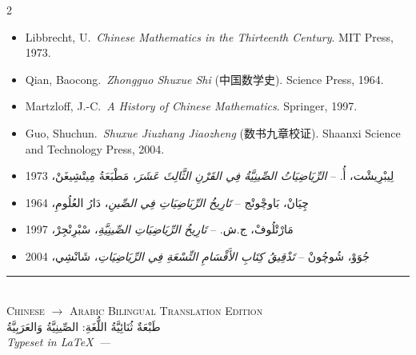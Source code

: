 \documentclass[11pt,a4paper]{article}
\newcommand{\ar}[1]{\arabicfont\beginR #1\endR}
\newcommand{\zhtext}[1]{{\chinese #1}}
\newenvironment{bilingual}{%
  \begin{paracol}{2}
}{%
  \end{paracol}
}
\begin{document}
\begin{bilingual}

\begin{leftcolumn*}
\begin{itemize}
  \item Libbrecht, U.\ \textit{Chinese Mathematics in the Thirteenth Century}. MIT Press, 1973.
  \item Qian, Baocong.\ \textit{Zhongguo Shuxue Shi} (\zhtext{中国数学史}). Science Press, 1964.
  \item Martzloff, J.-C.\ \textit{A History of Chinese Mathematics}. Springer, 1997.
  \item Guo, Shuchun.\ \textit{Shuxue Jiuzhang Jiaozheng} (\zhtext{数书九章校证}). Shaanxi Science and Technology Press, 2004.
\end{itemize}
\end{leftcolumn*}

\begin{rightcolumn*}
\begin{itemize}
  \item \ar{لِيبْرِيشْت، أُ. -- \textit{الرِّيَاضِيَاتُ الصِّينِيَّةُ فِي القَرْنِ الثَّالِثَ عَشَرَ}، مَطْبَعَةُ مِيتْشِيغَنْ، 1973}
  \item \ar{چِيَانْ، بَاوچْونْج -- \textit{تَارِيخُ الرِّيَاضِيَاتِ فِي الصِّينِ}، دَارُ العُلُومِ، 1964}
  \item \ar{مَارْتْلُوفْ، ج.ش. -- \textit{تَارِيخُ الرِّيَاضِيَاتِ الصِّينِيَّةِ}، سْبْرِنْجِرْ، 1997}
  \item \ar{جُوَوْ، شُوچُونْ -- \textit{تَدْقِيقُ كِتَابِ الأَقْسَامِ التِّسْعَةِ فِي الرِّيَاضِيَاتِ}، شَانْشِي، 2004}
\end{itemize}
\end{rightcolumn*}

\end{bilingual}

\vfill

\begin{center}
\textcolor{rulecolor}{\rule{0.5\textwidth}{0.4pt}}\\[0.5em]
\textsc{Chinese $\rightarrow$ Arabic Bilingual Translation Edition}\\[0.3em]
\ar{طَبْعَةٌ ثُنَائِيَّةُ اللُّغَةِ: الصِّينِيَّةُ وَالعَرَبِيَّةُ}\\[0.5em]
\textit{Typeset in \LaTeX\ --- \the\year}
\end{center}
\end{document}
